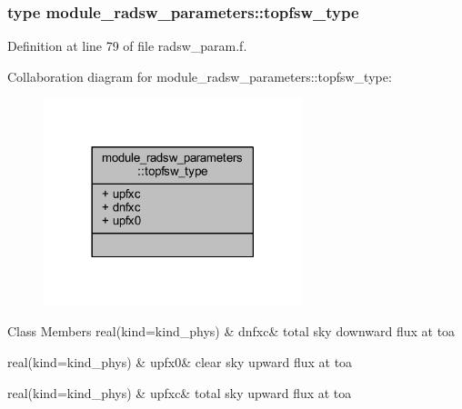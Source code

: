 \subsubsection{type module\+\_\+radsw\+\_\+parameters\+:\+:topfsw\+\_\+type}


Definition at line 79 of file radsw\+\_\+param.\+f.



Collaboration diagram for module\+\_\+radsw\+\_\+parameters\+:\+:topfsw\+\_\+type\+:\nopagebreak
\begin{figure}[H]
\begin{center}
\leavevmode
\includegraphics[width=213pt]{structmodule__radsw__parameters_1_1topfsw__type__coll__graph}
\end{center}
\end{figure}
\begin{DoxyFields}{Class Members}
real(kind=kind\+\_\+phys)\hypertarget{group__module__radsw__main_gac1466bb6a9da92a59bdef51439320f35}{}\label{group__module__radsw__main_gac1466bb6a9da92a59bdef51439320f35}
&
dnfxc&
total sky downward flux at toa \\
\hline

real(kind=kind\+\_\+phys)\hypertarget{group__module__radsw__main_ga992c82c935dcb4d6269c905fc184cf48}{}\label{group__module__radsw__main_ga992c82c935dcb4d6269c905fc184cf48}
&
upfx0&
clear sky upward flux at toa \\
\hline

real(kind=kind\+\_\+phys)\hypertarget{group__module__radsw__main_ga444a7fd67ff2c22403779a5e83eef09b}{}\label{group__module__radsw__main_ga444a7fd67ff2c22403779a5e83eef09b}
&
upfxc&
total sky upward flux at toa \\
\hline

\end{DoxyFields}
